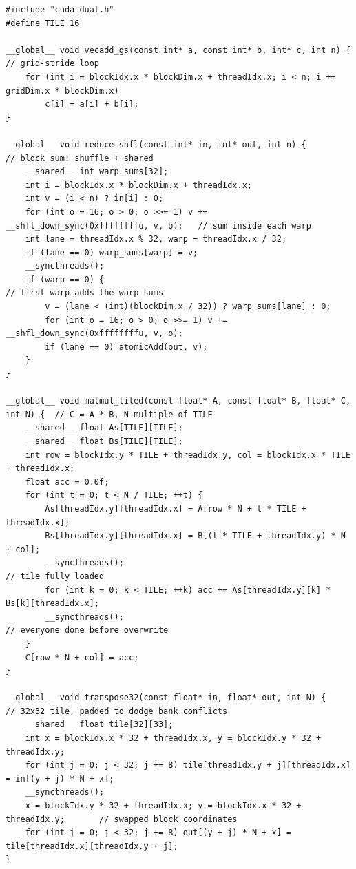 \documentclass[10pt,a4paper,openany,oneside]{report}
\begin{document}
\begin{lstlisting}[language={CUDA},basicstyle=\ttfamily\scriptsize,title={k15.cu: the kernels}]
#include "cuda_dual.h"
#define TILE 16

__global__ void vecadd_gs(const int* a, const int* b, int* c, int n) {          // grid-stride loop
    for (int i = blockIdx.x * blockDim.x + threadIdx.x; i < n; i += gridDim.x * blockDim.x)
        c[i] = a[i] + b[i];
}

__global__ void reduce_shfl(const int* in, int* out, int n) {                    // block sum: shuffle + shared
    __shared__ int warp_sums[32];
    int i = blockIdx.x * blockDim.x + threadIdx.x;
    int v = (i < n) ? in[i] : 0;
    for (int o = 16; o > 0; o >>= 1) v += __shfl_down_sync(0xffffffffu, v, o);   // sum inside each warp
    int lane = threadIdx.x % 32, warp = threadIdx.x / 32;
    if (lane == 0) warp_sums[warp] = v;
    __syncthreads();
    if (warp == 0) {                                                             // first warp adds the warp sums
        v = (lane < (int)(blockDim.x / 32)) ? warp_sums[lane] : 0;
        for (int o = 16; o > 0; o >>= 1) v += __shfl_down_sync(0xffffffffu, v, o);
        if (lane == 0) atomicAdd(out, v);
    }
}

__global__ void matmul_tiled(const float* A, const float* B, float* C, int N) {  // C = A * B, N multiple of TILE
    __shared__ float As[TILE][TILE];
    __shared__ float Bs[TILE][TILE];
    int row = blockIdx.y * TILE + threadIdx.y, col = blockIdx.x * TILE + threadIdx.x;
    float acc = 0.0f;
    for (int t = 0; t < N / TILE; ++t) {
        As[threadIdx.y][threadIdx.x] = A[row * N + t * TILE + threadIdx.x];
        Bs[threadIdx.y][threadIdx.x] = B[(t * TILE + threadIdx.y) * N + col];
        __syncthreads();                                                         // tile fully loaded
        for (int k = 0; k < TILE; ++k) acc += As[threadIdx.y][k] * Bs[k][threadIdx.x];
        __syncthreads();                                                         // everyone done before overwrite
    }
    C[row * N + col] = acc;
}

__global__ void transpose32(const float* in, float* out, int N) {                // 32x32 tile, padded to dodge bank conflicts
    __shared__ float tile[32][33];
    int x = blockIdx.x * 32 + threadIdx.x, y = blockIdx.y * 32 + threadIdx.y;
    for (int j = 0; j < 32; j += 8) tile[threadIdx.y + j][threadIdx.x] = in[(y + j) * N + x];
    __syncthreads();
    x = blockIdx.y * 32 + threadIdx.x; y = blockIdx.x * 32 + threadIdx.y;       // swapped block coordinates
    for (int j = 0; j < 32; j += 8) out[(y + j) * N + x] = tile[threadIdx.x][threadIdx.y + j];
}


\end{lstlisting}
\end{document}
